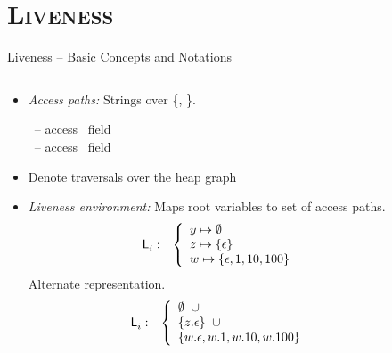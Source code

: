 \documentclass[xcolor=x11names,compress,mathserif]{beamer}
\renewcommand{\(}{\begin{columns}}
\renewcommand{\)}{\end{columns}}
\newcommand{\<}[1]{\begin{column}{#1}}
\renewcommand{\>}{\end{column}}
\begin{document}
\section{\scshape Liveness}
\begin{frame}{Liveness -- Basic Concepts and Notations}
\small
\begin{columns}
  \begin{column}[T]{0.75\textwidth}
    \begin{itemize}\itemsep0.75em
    \item {\em Access paths:} Strings over \{\acar, \acdr\}.
      
      \hspace*{.25cm}   \acar\  -- access \CAR\ field \\
      \hspace*{.25cm}   \acdr\  -- access \CDR\ field 
    \item Denote traversals over the heap graph
    \item {\em Liveness environment:} 
          {Maps root variables    to set of access paths.
            \begin{eqnarray*}
              \mathsf{L}_{{i}}^{}&:&
              \left\{\begin{array}{l}
              y \mapsto \emptyset\\
              z \mapsto \{\epsilon\}\\
              w \mapsto \{\epsilon, 1, 10, 100\}
              \end{array}\right.
            \end{eqnarray*}
          }
              {Alternate representation.
                \begin{eqnarray*}
                  \mathsf{L}_{{i}}^{}&:&
                  \left\{\begin{array}{l}
                  \emptyset \;\; \cup  \\
                  \{z.\epsilon\} \;\; \cup\\
                  \{w.\epsilon, w.1, w.10, w.100\}
                  \end{array}\right.
                \end{eqnarray*} 
              }
    \end{itemize}
  \end{column}
  \begin{column}[T]{0.25\textwidth}
  \end{column}
\end{columns}

\bigskip
\bigskip

\end{frame}
\end{document}
